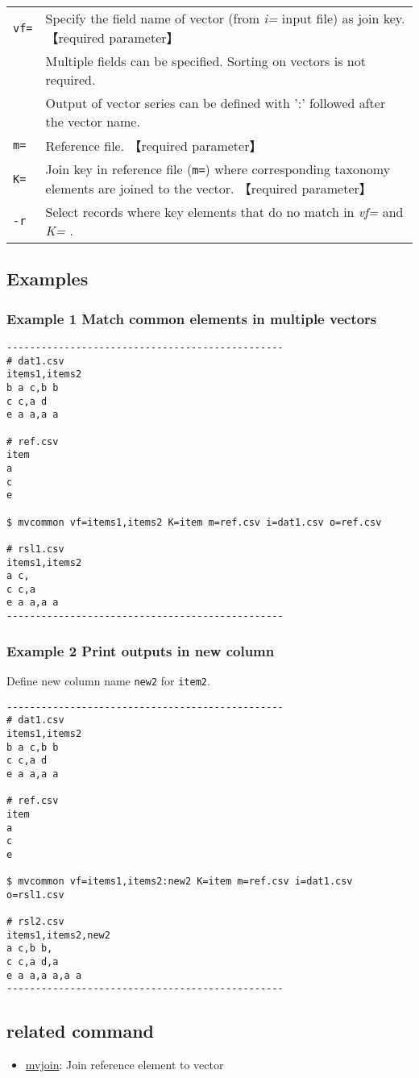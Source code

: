 \documentclass[a4paper]{jarticle}
\begin{document}
\begin{table}[htbp]
{\small
\begin{tabular}{ll}

\verb|vf=| & Specify the field name of vector (from \emph{i=} input file) as join key. 【required parameter】\\
           & Multiple fields can be specified. Sorting on vectors is not required. \\
           & Output of vector series can be defined with ':' followed after the vector name. \\
\verb|m=|  & Reference file. 【required parameter】 \\
\verb|K=|  &  Join key in reference file (\verb|m=|) where corresponding taxonomy elements are joined to the vector. 【required parameter】\\
\verb|-r|  & Select records where key elements that do no match in \emph{vf=} and \emph{K=} .   \\
\end{tabular}
}
\end{table} 

\subsection*{Examples}
\subsubsection*{Example 1 Match common elements in multiple vectors }
\begin{verbatim}
------------------------------------------------
# dat1.csv
items1,items2
b a c,b b
c c,a d
e a a,a a

# ref.csv
item
a
c
e

$ mvcommon vf=items1,items2 K=item m=ref.csv i=dat1.csv o=ref.csv

# rsl1.csv
items1,items2
a c,
c c,a
e a a,a a
------------------------------------------------
\end{verbatim}

\subsubsection*{Example 2 Print outputs in new column }
Define new column name  \verb|new2| for \verb|item2|. 
\begin{verbatim}
------------------------------------------------
# dat1.csv
items1,items2
b a c,b b
c c,a d
e a a,a a

# ref.csv
item
a
c
e

$ mvcommon vf=items1,items2:new2 K=item m=ref.csv i=dat1.csv o=rsl1.csv

# rsl2.csv
items1,items2,new2
a c,b b,
c c,a d,a
e a a,a a,a a
------------------------------------------------
\end{verbatim}


\subsection*{related command}
\begin{itemize}
\item \href{run:mvjoin.pdf}{mvjoin}: Join reference element to vector
\end{itemize}
\end{document}
